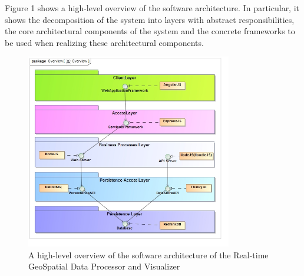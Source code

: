 Figure 1 shows a high-level overview of the software architecture. In particular, it shows the decomposition of the system into layers with abstract responsibilities, the core architectural components of the system and the concrete frameworks to be used when realizing these architectural components.

\begin{figure}[ht!]
\centering
\includegraphics[width=90mm]{Overview.jpg}
\caption{A high-level overview of the software architecture of the Real-time GeoSpatial Data Processor and Visualizer \label{overflow}}
\end{figure}